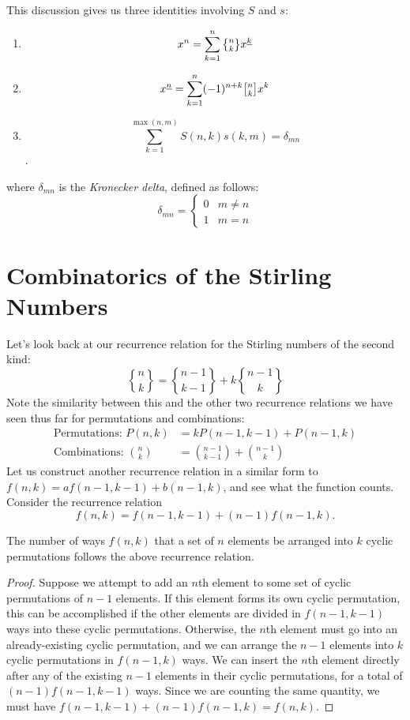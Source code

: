 \documentclass[11pt,twosided]{article}
\newcommand{\stirlingone}[2]{\genfrac[]{0pt}{1}{#1}{#2}}
\newcommand{\stiri}[2]{\stirlingone{#1}{#2}}
\newcommand{\stirlingtwo}[2]{\genfrac\{\}{0pt}{1}{#1}{#2}}
\newcommand{\stirii}[2]{\stirlingtwo{#1}{#2}}
\newcommand{\dstirlingtwo}[2]{\genfrac\{\}{0pt}{0}{#1}{#2}}
\newcommand{\dstirii}[2]{\dstirlingtwo{#1}{#2}}
\begin{document}
This discussion gives us three identities involving $S$ and $s$: 
\begin{enumerate}
	\item \[ x^n = \sum_{k=1}^{n} \stirii{n}{k} \ff{x}{k} \] %
	\item \[ \ff{x}{n} = \sum_{k=1}^{n} (-1)^{n+k} \stiri{n}{k} x^k \] %
	\item \[ \sum_{k=1}^{\max(n, m)} S(n, k) s(k, m) = \delta_{mn} \].
\end{enumerate}
where $\delta_{mn}$ is the \textit{Kronecker delta}, defined as follows: 
\[
	\delta_{mn} = \begin{cases}
		0 & m \neq n \\
		1 & m = n
	\end{cases}
\]


\section{Combinatorics of the Stirling Numbers}
Let's look back at our recurrence relation for the Stirling numbers of the second kind: 
\[
	\dstirii{n}{k} = \dstirii{n-1}{k-1} + k \dstirii{n-1}{k}
\]
Note the similarity between this and the other two recurrence relations we have seen thus far for permutations and combinations: 
\begin{align*}
	\text{Permutations: } P(n, k) &= k P(n-1, k-1) + P(n-1, k) \\
	\text{Combinations: } \binom{n}{k} &= \binom{n-1}{k-1} + \binom{n-1}{k} 
\end{align*}
Let us construct another recurrence relation in a similar form to $f(n, k) = af(n-1, k-1) + b(n-1, k)$, and see what the function counts. Consider the recurrence relation 
\[
	f(n, k) = f(n-1, k-1) + (n-1) f(n-1, k).
\]
\begin{proposition}{1}
The number of ways $f(n, k)$ that a set of $n$ elements be arranged into $k$ cyclic permutations follows the above recurrence relation. 
\end{proposition}

\begin{proof}
	Suppose we attempt to add an $n$th element to some set of cyclic permutations of $n-1$ elements. If this element forms its own cyclic permutation, this can be accomplished if the other elements are divided in $f(n-1, k-1)$ ways into these cyclic permutations. Otherwise, the $n$th element must go into an already-existing cyclic permutation, and we can arrange the $n-1$ elements into $k$ cyclic permutations in $f(n-1, k)$ ways. We can insert the $n$th element directly after any of the existing $n-1$ elements in their cyclic permutations, for a total of $(n-1)f(n-1, k-1)$ ways. Since we are counting the same quantity, we must have $f(n-1, k-1) + (n-1)f(n-1, k) = f(n, k)$. 
\end{proof}
\end{document}
